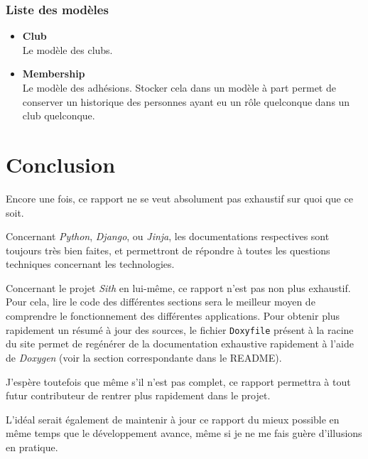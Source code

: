 \documentclass[a4paper]{report}
\begin{document}
\subsection{Liste des modèles}
\label{sub:liste_des_modeles}
\begin{itemize}
    \item \textbf{Club} \\
        Le modèle des clubs.
    \item \textbf{Membership} \\
        Le modèle des adhésions. Stocker cela dans un modèle à part permet de conserver un historique des personnes
        ayant eu un rôle quelconque dans un club quelconque.
\end{itemize}



\chapter{Conclusion}
\par Encore une fois, ce rapport ne se veut absolument pas exhaustif sur quoi que ce soit.
\par Concernant \emph{Python}, \emph{Django}, ou \emph{Jinja}, les documentations respectives sont toujours très bien
faites, et permettront de répondre à toutes les questions techniques concernant les technologies.
\par Concernant le projet \emph{Sith} en lui-même, ce rapport n'est pas non plus exhaustif. Pour cela, lire le code des
différentes sections sera le meilleur moyen de comprendre le fonctionnement des différentes applications. Pour obtenir plus
rapidement un résumé à jour des sources, le fichier \verb#Doxyfile# présent à la racine du site permet de regénérer de
la documentation exhaustive rapidement à l'aide de \emph{Doxygen} (voir la section correspondante dans le README).
\par J'espère toutefois que même s'il n'est pas complet, ce rapport permettra à tout futur contributeur de rentrer plus
rapidement dans le projet.
\par L'idéal serait également de maintenir à jour ce rapport du mieux possible en même temps que le développement
avance, même si je ne me fais guère d'illusions en pratique.
\end{document}
